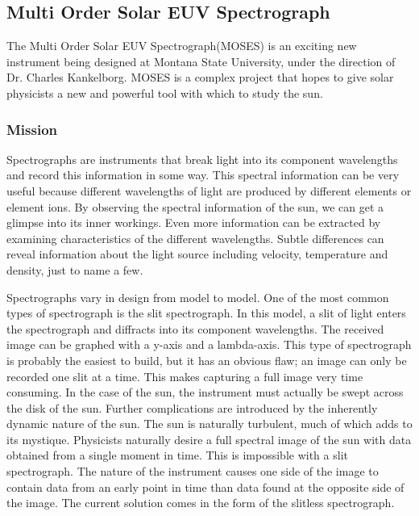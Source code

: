\documentclass[11pt,titlepage]{article}
\begin{document}
\subsection{Multi Order Solar EUV Spectrograph}

The Multi Order Solar EUV Spectrograph(MOSES) is an exciting new instrument being designed at
Montana State University, under the direction of Dr. Charles Kankelborg. MOSES is a complex
project that hopes to give solar physicists a new and powerful tool with which to study the sun.

\subsubsection{Mission}

Spectrographs are instruments that break light into its component wavelengths and record this information in some way. 
This spectral information can be very useful because different wavelengths of light are produced by different elements or element ions.
By observing the spectral information of the sun, we can get a glimpse into its inner workings. Even more information can be extracted by
examining characteristics of the different wavelengths. Subtle differences can reveal information about the light source including velocity,
temperature and density, just to name a few. 


Spectrographs vary in design from model to model. One of the most common types of spectrograph is the slit spectrograph. In this model, a slit 
of light enters the spectrograph and diffracts into its component wavelengths. The received image can be graphed with a y-axis and a lambda-axis.
This type of spectrograph is probably the easiest to build, but it has an obvious flaw; an image can only be recorded one slit at a time. This 
makes capturing a full image very time consuming. In the case of the sun, the instrument must actually be swept across the disk of the sun. Further
complications are introduced by the inherently dynamic nature of the sun. The sun is naturally turbulent, much of which adds to its mystique. Physicists
naturally desire a full spectral image of the sun with data obtained from a single moment in time. This is impossible with a slit spectrograph. The 
nature of the instrument causes one side of the image to contain data from an early point in time than data found at the opposite side of the image.
The current solution comes in the form of the slitless spectrograph.
\end{document}
